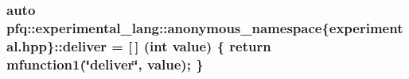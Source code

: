 \hypertarget{namespacepfq_1_1experimental__lang_1_1anonymous__namespace_02experimental_8hpp_03_a2ca2e5f03bcea1059d5f334b2ee73ffe}{
\subsubsection[{deliver}]{\setlength{\rightskip}{0pt plus 5cm}auto pfq\+::experimental\+\_\+lang\+::anonymous\+\_\+namespace\{experimental.\+hpp\}\+::deliver = \mbox{[}$\,$\mbox{]} (int value) \{ return mfunction1(\char`\"{}deliver\char`\"{}, value); \}}}\label{namespacepfq_1_1experimental__lang_1_1anonymous__namespace_02experimental_8hpp_03_a2ca2e5f03bcea1059d5f334b2ee73ffe}
